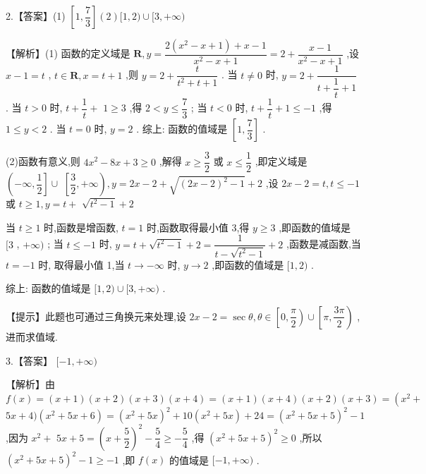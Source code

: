 \documentclass[10pt]{article}
\begin{document}
2.【答案】(1) $\left\lbrack  {1,\dfrac{7}{3}}\right\rbrack  \left( 2\right) \lbrack 1,2) \cup  \lbrack 3, + \infty )$

【解析】(1) 函数的定义域是 $\mathbf{R},y = \dfrac{2\left( {{x}^{2} - x + 1}\right)  + x - 1}{{x}^{2} - x + 1} = 2 + \dfrac{x - 1}{{x}^{2} - x + 1}$ ,设 $x - 1 = t$ , $t \in  \mathbf{R},x = t + 1$ ,则 $y = 2 + \dfrac{t}{{t}^{2} + t + 1}$ . 当 $t \neq  0$ 时, $y = 2 + \dfrac{1}{t + \dfrac{1}{t} + 1}$ . 当 $t > 0$ 时, $t + \dfrac{1}{t} +$  $1 \geq  3$ ,得 $2 < y \leq  \dfrac{7}{3}$ ; 当 $t < 0$ 时, $t + \dfrac{1}{t} + 1 \leq   - 1$ ,得 $1 \leq  y < 2$ . 当 $t = 0$ 时, $y = 2$ . 综上: 函数的值域是 $\left\lbrack  {1,\dfrac{7}{3}}\right\rbrack$ .

(2)函数有意义,则 $4{x}^{2} - {8x} + 3 \geq  0$ ,解得 $x \geq  \dfrac{3}{2}$ 或 $x \leq  \dfrac{1}{2}$ ,即定义域是 $\left( {-\infty ,\dfrac{1}{2}}\right\rbrack   \cup$  $\left\lbrack  {\dfrac{3}{2}, + \infty }\right) ,y = {2x} - 2 + \sqrt{{\left( 2x - 2\right) }^{2} - 1} + 2$ ,设 ${2x} - 2 = t,t \leq   - 1$ 或 $t \geq  1,y = t +$  $\sqrt{{t}^{2} - 1} + 2$

当 $t \geq  1$ 时,函数是增函数, $t = 1$ 时,函数取得最小值 3,得 $y \geq  3$ ,即函数的值域是 $\lbrack 3$ , $+ \infty )$ ; 当 $t \leq   - 1$ 时, $y = t + \sqrt{{t}^{2} - 1} + 2 = \dfrac{1}{t - \sqrt{{t}^{2} - 1}} + 2$ ,函数是减函数,当 $t =  - 1$ 时, 取得最小值 1,当 $t \rightarrow   - \infty$ 时, $y \rightarrow  2$ ,即函数的值域是 $\lbrack 1,2)$ .

综上: 函数的值域是 $\lbrack 1,2) \cup  \lbrack 3, + \infty )$ .

【提示】此题也可通过三角换元来处理,设 ${2x} - 2 = \sec \theta ,\theta  \in  \left\lbrack  {0,\dfrac{\pi }{2}}\right)  \cup  \left\lbrack  {\pi ,\dfrac{3\pi }{2}}\right)$ ,进而求值域.

3.【答案】 $\lbrack  - 1, + \infty )$

【解析】由 $f\left( x\right)  = \left( {x + 1}\right) \left( {x + 2}\right) \left( {x + 3}\right) \left( {x + 4}\right)  = \left( {x + 1}\right) \left( {x + 4}\right) \left( {x + 2}\right) \left( {x + 3}\right)  = \left( {{x}^{2} + }\right.$  ${5x} + 4)\left( {{x}^{2} + {5x} + 6}\right)  = {\left( {x}^{2} + 5x\right) }^{2} + {10}\left( {{x}^{2} + {5x}}\right)  + {24} = {\left( {x}^{2} + 5x + 5\right) }^{2} - 1$ ,因为 ${x}^{2} +$  ${5x} + 5 = {\left( x + \dfrac{5}{2}\right) }^{2} - \dfrac{5}{4} \geq   - \dfrac{5}{4}$ ,得 ${\left( {x}^{2} + 5x + 5\right) }^{2} \geq  0$ ,所以 ${\left( {x}^{2} + 5x + 5\right) }^{2} - 1 \geq   - 1$ ,即 $f\left( x\right)$ 的值域是 $\lbrack  - 1, + \infty )$ .
\end{document}
